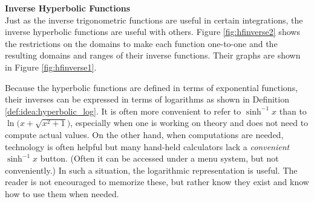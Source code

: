 \noindent\textbf{\large Inverse Hyperbolic Functions}\\

Just as the inverse trigonometric functions are useful in certain integrations, the inverse hyperbolic functions are useful with others. Figure \ref{fig:hfinverse2} shows the restrictions on the domains to make each function one-to-one and the resulting domains and ranges of their inverse functions. Their graphs are shown in Figure \ref{fig:hfinverse1}.

Because the hyperbolic functions are defined in terms of exponential functions, their inverses can be expressed in terms of logarithms as shown in Definition \ref{def:idea:hyperbolic_log}. It is often more convenient to refer to $\sinh^{-1}x$ than to $\ln\big(x+\sqrt{x^2+1}\big)$, especially when one is working on theory and does not need to compute actual values. On the other hand, when computations are needed, technology is often helpful but many hand-held calculators lack a \textit{convenient} $\sinh^{-1}x$ button. (Often it can be accessed under a menu system, but not conveniently.) In such a situation, the logarithmic representation is useful. The reader is not encouraged to memorize these, but rather know they exist and know how to use them when needed.



